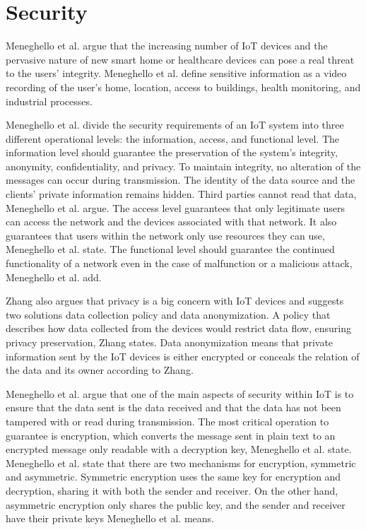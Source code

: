 \section{Security}
Meneghello et al. argue that the increasing number of IoT devices and the pervasive nature of new smart home or healthcare devices can pose a real threat to the users' integrity.
Meneghello et al. define sensitive information as a video recording of the user's home, location, access to buildings, health monitoring, and industrial processes.\cite{Meneghello2019}

Meneghello et al. divide the security requirements of an IoT system into three different operational levels: the information, access, and functional level.
The information level should guarantee the preservation of the system's integrity, anonymity, confidentiality, and privacy. 
To maintain integrity, no alteration of the messages can occur during transmission. The identity of the data source and the clients' private information remains hidden. Third parties cannot read that data, Meneghello et al. argue.
The access level guarantees that only legitimate users can access the network and the devices associated with that network. 
It also guarantees that users within the network only use resources they can use, Meneghello et al. state.
The functional level should guarantee the continued functionality of a network even in the case of malfunction or a malicious attack, Meneghello et al. add.\cite{Meneghello2019}

Zhang also argues that privacy is a big concern with IoT devices and suggests two solutions data collection policy and data anonymization.
A policy that describes how data collected from the devices would restrict data flow, ensuring privacy preservation, Zhang states.
Data anonymization means that private information sent by the IoT devices is either encrypted or conceals the relation of the data and its owner according to Zhang.\cite{Zhang2014}

Meneghello et al. argue that one of the main aspects of security within IoT is to ensure that the data sent is the data received and that the data has not been tampered with or read during transmission.
The most critical operation to guarantee is encryption, which converts the message sent in plain text to an encrypted message only readable with a decryption key, Meneghello et al. state.
Meneghello et al. state that there are two mechanisms for encryption, symmetric and asymmetric.
Symmetric encryption uses the same key for encryption and decryption, sharing it with both the sender and receiver.
On the other hand, asymmetric encryption only shares the public key, and the sender and receiver have their private keys Meneghello et al. means.\cite{Meneghello2019}

